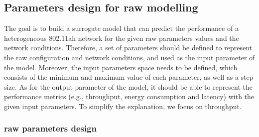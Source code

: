  
 
\subsection{Parameters design for \gls{raw} modelling \label{subsec:para_design}}


The goal is to build a surrogate model that can predict the performance of a heterogeneous 802.11ah network for the given \gls{raw} parameters values and the network conditions. Therefore, a set of parameters should be defined to represent the \gls{raw} configuration and network conditions,  and used as the input parameter of the model. Moreover, the input parameters space needs to be defined, which consists of the minimum and maximum value of each parameter, as well as a step size. As for the output parameter of the model, it should be able to represent the performance metrics (e.g., throughput, energy consumption and latency) with the given input parameters. To simplify the explanation, we focus on throughput.



\subsubsection{\gls{raw} parameters design \label{subsec:raw_para_design}}

